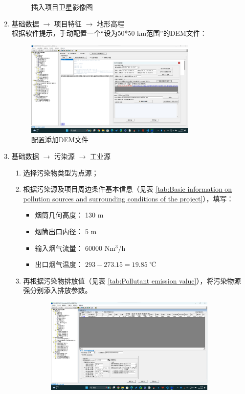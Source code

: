 \begin{enumerate}
\begin{figure}[H]
        \caption{插入项目卫星影像图}
    \end{figure}
    \item 基础数据 $\rightarrow $ 项目特征 $\rightarrow $ 地形高程 \\
    根据软件提示，手动配置一个“设为50*50 km范围”的DEM文件：
    \begin{figure}[H]
        \centering
        \includegraphics[width=0.8\textwidth]{figures/step3.png}
        \caption{配置添加DEM文件}
    \end{figure}
    \item 基础数据 $\rightarrow $ 污染源 $\rightarrow $ 工业源
    \begin{enumerate}[label=(\arabic*)]
        \item 选择污染物类型为点源；
        \item 根据污染源及项目周边条件基本信息（见表 \ref{tab:Basic information on pollution sources and surrounding conditions of the project}），填写：
        \begin{itemize}
            \item 烟筒几何高度： 130 m
            \item 烟筒出口内径： 5 m
            \item 输入烟气流量： 60000 Nm$^3$/h
            \item 出口烟气温度： $293-273.15=19.85$ ℃
        \end{itemize}
        \item 再根据污染物排放值（见表 \ref{tab:Pollutant emission value}），将污染物源强分别添入排放参数。
    \end{enumerate}
    \begin{figure}[H]
        \centering
        \begin{subfigure}[htpb]{0.8\textwidth}
            \centering
            \includegraphics[width=\textwidth]{figures/step4-1.png}

\end{subfigure}
\end{figure}
\end{enumerate}
